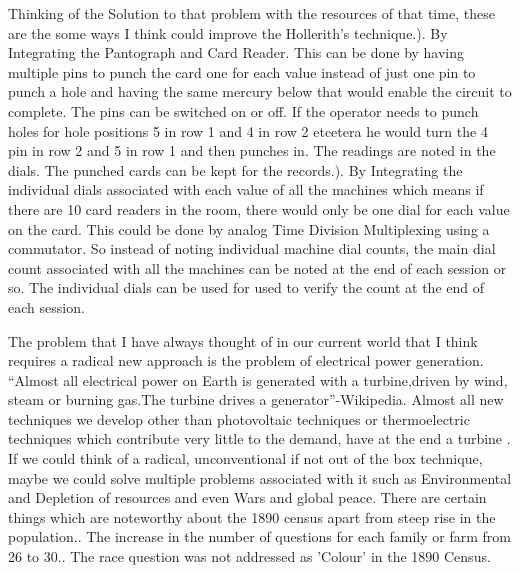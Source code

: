 \documentclass[fleqn,letterpaper,12pt]{report}
\begin{document}
\assignmenttitle

%
{}
\problem
Thinking of the Solution to that problem with the resources of that time, these are the some ways I think could improve the Hollerith’s technique.). By Integrating the Pantograph and Card Reader. This can be done by having multiple pins to punch the card one for each value instead of just one pin to punch a hole and having the same mercury below that would enable the circuit to complete. The pins can be switched on or off. If the operator needs to punch holes for hole positions 5 in row 1 and 4 in row 2 etcetera he would turn the 4 pin in row 2 and 5 in row 1 and then punches in. The readings are noted in the dials. The punched cards can be kept for the records.). By Integrating the individual dials associated with each value of all the machines which means if there are 10 card readers in the room, there would only be one dial for each value on the card. This could be done by analog Time Division Multiplexing using a commutator. So instead of noting individual machine dial counts, the main dial count associated with all the machines can be noted at the end of each session or so. The individual dials can be used for used to verify the count at the end of each session.\cite{Census}

The problem that I have always thought of in our current world that I think requires a radical new approach is the problem of electrical power generation. “Almost all electrical power on Earth is generated with a turbine,driven by wind, steam or burning gas.The turbine drives a generator”-Wikipedia.
Almost all new techniques we develop other than photovoltaic techniques or thermoelectric techniques which contribute very little to the demand, have at the end a turbine . If we could think of a radical, unconventional if not out of the box technique, maybe we could solve multiple problems associated with it such as Environmental and Depletion of resources and even Wars and global peace.\break
\newline
There are certain things which are noteworthy about the 1890 census apart from steep rise in the population.. The increase in the number of questions for each family or farm from 26 to 30.. The race question was not addressed as 'Colour' in the 1890 Census.
\end{document}
